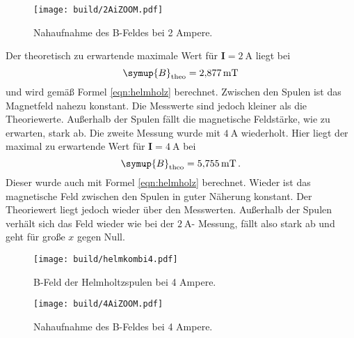\begin{figure}
  \texttt{[image: build/2AiZOOM.pdf]}
  \caption{Nahaufnahme des B-Feldes bei 2 Ampere.}
  \label{fig:2zoom}
\end{figure}
\noindent Der theoretisch zu erwartende maximale Wert für
$\symbf{I}=\SI{2}{\ampere}$ liegt bei
\begin{equation*}
    \symup{B}_\text{theo} = \SI{2.877}{\milli\tesla}
\end{equation*}
und wird gemäß Formel \eqref{eqn:helmholz} berechnet.
Zwischen den Spulen ist das Magnetfeld nahezu konstant. Die Messwerte sind
jedoch kleiner als die Theoriewerte. Außerhalb der Spulen fällt die
magnetische Feldstärke, wie zu erwarten, stark ab.
Die zweite Messung wurde mit $\SI{4}{\ampere}$ wiederholt.
Hier liegt der maximal zu erwartende Wert für $\symbf{I}=\SI{4}{\ampere}$
bei
\begin{equation*}
  \symup{B}_\text{theo} = \SI{5.755}{\milli\tesla} \,.
\end{equation*}
Dieser wurde auch mit Formel \eqref{eqn:helmholz} berechnet.
Wieder ist das magnetische Feld zwischen den Spulen in guter Näherung konstant.
Der Theoriewert liegt jedoch wieder über den Messwerten. Außerhalb der Spulen
verhält sich das Feld wieder wie bei der $\SI{2}{\ampere}$- Messung, fällt also
stark ab und geht für große $x$ gegen Null.
\begin{figure}
  \texttt{[image: build/helmkombi4.pdf]}
  \caption{B-Feld der Helmholtzspulen bei 4 Ampere.}
  \label{fig:helm4}
\end{figure}

\begin{figure}
  \texttt{[image: build/4AiZOOM.pdf]}
  \caption{Nahaufnahme des B-Feldes bei 4 Ampere.}
  \label{fig:4zoom}
\end{figure}

